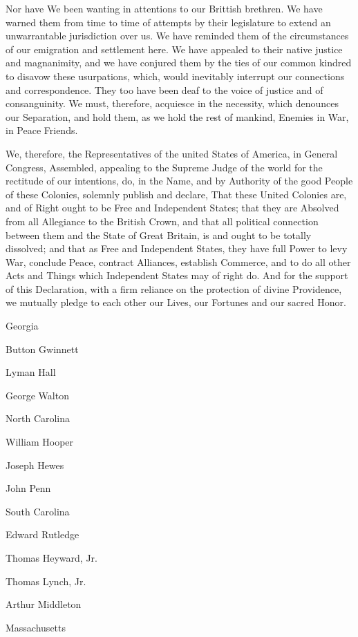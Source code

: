 \documentclass[a4paper,landscape,10pt]{article}
\begin{document}
Nor have We been wanting in attentions to our Brittish brethren.
We have warned them from time to time
of attempts by their legislature to extend an unwarrantable jurisdiction over us.
We have reminded them of the circumstances of our emigration and settlement here.
We have appealed to their native justice and magnanimity,
and we have conjured them by the ties of our common kindred to disavow these usurpations,
which, would inevitably interrupt our connections and correspondence.
They too have been deaf to the voice of justice and of consanguinity.
We must, therefore, acquiesce in the necessity,
which denounces our Separation,
and hold them, as we hold the rest of mankind,
Enemies in War, in Peace Friends.

We, therefore, the Representatives of the united States of America,
in General Congress, Assembled,
appealing to the Supreme Judge of the world for the rectitude of our intentions,
do, in the Name, and by Authority of the good People of these Colonies, solemnly publish and declare,
That these United Colonies are, and of Right ought to be Free and Independent States;
that they are Absolved from all Allegiance to the British Crown,
and that all political connection between them and the State of Great Britain,
is and ought to be totally dissolved;
and that as Free and Independent States,
they have full Power
to levy War,
conclude Peace,
contract Alliances,
establish Commerce,
and to do all other Acts and Things which Independent States may of right do.
And for the support of this Declaration,
with a firm reliance on the protection of divine Providence,
we mutually pledge to each other our Lives, our Fortunes and our sacred Honor.

Georgia

Button Gwinnett

Lyman Hall

George Walton



North Carolina

William Hooper

Joseph Hewes

John Penn



South Carolina

Edward Rutledge

Thomas Heyward, Jr.

Thomas Lynch, Jr.

Arthur Middleton



Massachusetts
\end{document}
